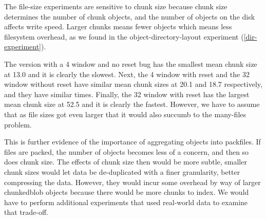 The file-size experiments are sensitive to chunk size because chunk size
determines the number of chunk objects, and the number of objects on the disk
affects write speed. Larger chunks means fewer objects which means less
filesystem overhead, as we found in the object-directory-layout experiment
(\autoref{dir-experiment}).

The version with a \SI{4}{\kib} window and no reset bug has the smallest mean
chunk size at \SI{13.0}{\kib} and it is clearly the slowest. Next, the
\SI{4}{\kib} window with reset and the \SI{32}{\kib} window without reset have
similar mean chunk sizes at \SI{20.1}{\kib} and \SI{18.7}{\kib} respectively,
and they have similar times. Finally, the \SI{32}{\kib} window with reset has
the largest mean chunk size at \SI{52.5}{\kib} and it is clearly the fastest.
However, we have to assume that as file sizes got even larger that it would also
succumb to the many-files problem.

This is further evidence of the importance of aggregating objects into
\glspl{packfile}. If files are packed, the number of objects becomes less of a
concern, and then so does chunk size. The effects of chunk size then would be
more subtle, smaller chunk sizes would let data be de-duplicated with a finer
granularity, better compressing the data. However, they would incur some
overhead by way of larger \gls{chunkedblob} objects because there would be more
chunks to index. We would have to perform additional experiments that used
real-world data to examine that trade-off.

%
